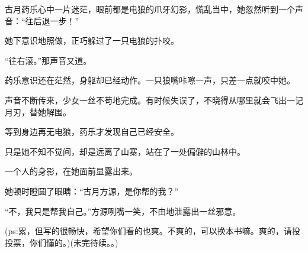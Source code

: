 \begin{this_body}
古月药乐心中一片迷茫，眼前都是电狼的爪牙幻影，慌乱当中，她忽然听到一个声音：“往后退一步！”

她下意识地照做，正巧躲过了一只电狼的扑咬。

“往右滚。”那声音又道。

药乐意识还在茫然，身躯却已经动作。一只狼嘴咔嚓一声，只差一点就咬中她。

声音不断传来，少女一丝不苟地完成。有时候失误了，不晓得从哪里就会飞出一记月刃，替她解围。

等到身边再无电狼，药乐才发现自己已经安全。

只是她不知不觉间，却是远离了山寨，站在了一处偏僻的山林中。

一个人的身影，在她面前显露出来。

她顿时瞪圆了眼睛：“古月方源，是你帮的我？”

“不，我只是帮我自己。”方源咧嘴一笑，不由地泄露出一丝邪意。

(ps:累，但写的很畅快，希望你们看的也爽。不爽的，可以换本书嘛。爽的，请投投票，你们懂的。)(未完待续。。)

\end{this_body}

